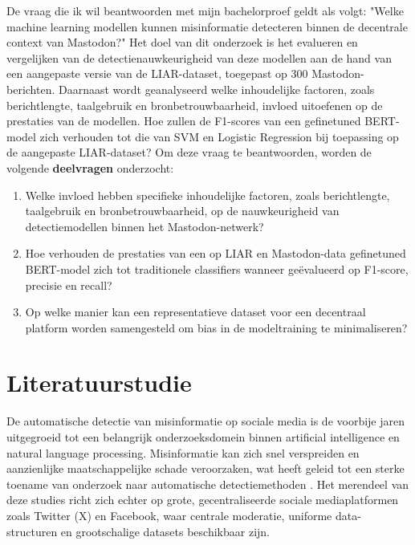 De vraag die ik wil beantwoorden met mijn bachelorproef geldt als volgt: 
"Welke machine learning modellen kunnen misinformatie detecteren binnen de decentrale context van Mastodon?"
Het doel van dit onderzoek is het evalueren en vergelijken van de detectienauwkeurigheid
van deze modellen aan de hand van een aangepaste versie van de LIAR-dataset,
toegepast op 300 Mastodon-berichten.
Daarnaast wordt geanalyseerd welke inhoudelijke factoren, zoals berichtlengte,
taalgebruik en bronbetrouwbaarheid, invloed uitoefenen op de prestaties van de modellen.
Hoe zullen de F1-scores van een gefinetuned BERT-model zich verhouden tot die van SVM en Logistic Regression bij toepassing op de aangepaste LIAR-dataset?
Om deze vraag te beantwoorden, worden de volgende \textbf{deelvragen} onderzocht:
\begin{enumerate}[leftmargin=*]
    \item Welke invloed hebben specifieke inhoudelijke factoren, zoals berichtlengte, taalgebruik en bronbetrouwbaarheid, op de nauwkeurigheid van detectiemodellen binnen het Mastodon-netwerk?
    \item Hoe verhouden de prestaties van een op LIAR en Mastodon-data gefinetuned BERT-model zich tot traditionele classifiers wanneer geëvalueerd op F1-score, precisie en recall?
    \item Op welke manier kan een representatieve dataset voor een decentraal platform worden samengesteld om bias in de modeltraining te minimaliseren?
\end{enumerate}


\section{Literatuurstudie}
\label{sec:literatuurstudie}

De automatische detectie van misinformatie op sociale media is de voorbije jaren
uitgegroeid tot een belangrijk onderzoeksdomein binnen artificial intelligence en natural language processing.
Misinformatie kan zich snel verspreiden en aanzienlijke maatschappelijke schade veroorzaken,
wat heeft geleid tot een sterke toename van onderzoek naar automatische detectiemethoden \autocite{Shu2017,Vosoughi2018}.
Het merendeel van deze studies richt zich echter op grote, gecentraliseerde sociale mediaplatformen
zoals Twitter (X) en Facebook, waar centrale moderatie, uniforme data-structuren
en grootschalige datasets beschikbaar zijn.

